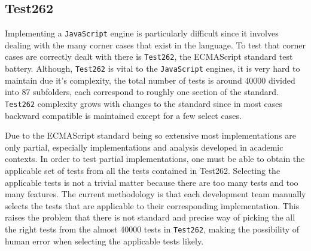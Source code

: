 \documentclass[runningheads]{llncs}
\begin{document}
\subsection{Test262}
\label{subsec:Test262}


Implementing a \texttt{JavaScript} engine is particularly difficult since it involves dealing with the many corner cases that exist in the language. To test that corner cases are correctly dealt with there is \texttt{Test262}, the ECMAScript standard test battery. Although, \texttt{Test262} is vital to the \texttt{JavaScript} engines, it is very hard to maintain due it's complexity, the total number of tests is around 40000 divided into 87 subfolders, each correspond to roughly one section of the standard. \texttt{Test262} complexity grows with changes to the standard since in most cases backward compatible is maintained except for a few select cases.



Due to the ECMAScript standard being so extensive most implementations are only partial, especially implementations and analysis developed in academic contexts. In order to test partial implementations, one must be able to obtain the applicable set of tests from all the tests contained in Test262. Selecting the applicable tests is not a trivial matter because there are too many tests and too many features. The current methodology is that each development team manually selects the tests that are applicable to their corresponding implementation. This raises the problem that there is not standard and precise way of picking the all the right tests from the almost 40000 tests in \texttt{Test262}, making the possibility of human error when selecting the applicable tests likely.
\end{document}
